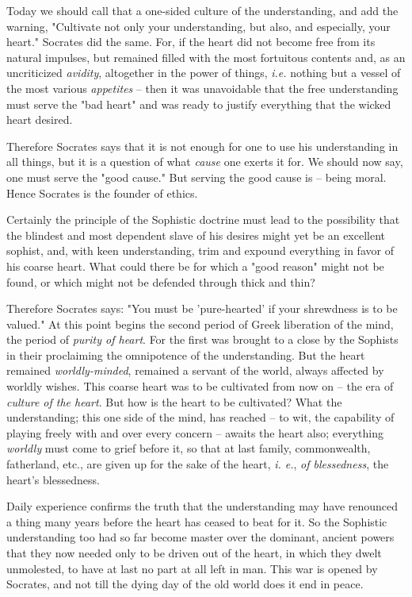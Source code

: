 Today we should call that a one-sided culture of the understanding, and add 
the warning, "{}Cultivate not only your understanding, but also, and 
especially, your heart."{} Socrates did the same. For, if the heart did not 
become free from its natural impulses, but remained filled with the most 
fortuitous contents and, as an uncriticized \textit{avidity}, altogether in 
the power of things, \textit{i.e.} nothing but a vessel of the most various 
\textit{appetites} -- then it was unavoidable that the free understanding must 
serve the "{}bad heart"{} and was ready to justify everything that the wicked 
heart desired.

Therefore Socrates says that it is not enough for one to use his understanding 
in all things, but it is a question of what \textit{cause} one exerts it for. 
We should now say, one must serve the "{}good cause."{} But serving the good 
cause is -- being moral. Hence Socrates is the founder of ethics.

Certainly the principle of the Sophistic doctrine must lead to the possibility 
that the blindest and most dependent slave of his desires might yet be an 
excellent sophist, and, with keen understanding, trim and expound everything 
in favor of his coarse heart. What could there be for which a "{}good 
reason"{} might not be found, or which might not be defended through thick and 
thin?

Therefore Socrates says: "{}You must be 'pure-hearted' if your shrewdness is 
to be valued."{} At this point begins the second period of Greek liberation of 
the mind, the period of \textit{purity of heart}. For the first was brought to 
a close by the Sophists in their proclaiming the omnipotence of the 
understanding. But the heart remained \textit{worldly-minded}, remained a 
servant of the world, always affected by worldly wishes. This coarse heart was 
to be cultivated from now on -- the era of \textit{culture of the heart}. But 
how is the heart to be cultivated? What the understanding; this one side of 
the mind, has reached -- to wit, the capability of playing freely with and 
over every concern -- awaits the heart also; everything \textit{worldly} must 
come to grief before it, so that at last family, commonwealth, fatherland, 
etc., are given up for the sake of the heart, \textit{i. e.}, \textit{of 
blessedness}, the heart's blessedness.

Daily experience confirms the truth that the understanding may have renounced 
a thing many years before the heart has ceased to beat for it. So the 
Sophistic understanding too had so far become master over the dominant, 
ancient powers that they now needed only to be driven out of the heart, in 
which they dwelt unmolested, to have at last no part at all left in man. This 
war is opened by Socrates, and not till the dying day of the old world does it 
end in peace.

